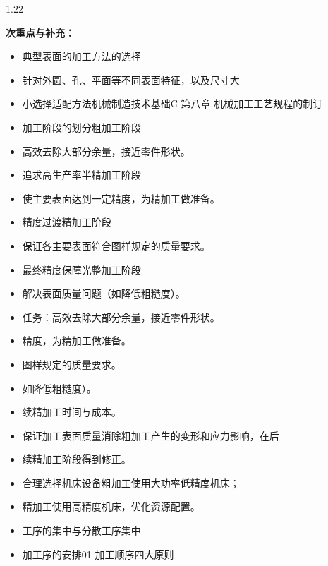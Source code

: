 \documentclass[12pt,a4paper]{article}
\begin{document}
\begin{spacing}{1.22}
\begin{tcolorbox}[colback=yellow!6,colframe=red!55!black,title=重点,left=1mm,right=1mm]
\end{tcolorbox}
\noindent\textbf{次重点与补充：}
\begin{itemize}[leftmargin=2.2em,label=--]
  \item 典型表面的加工方法的选择
  \item 针对外圆、孔、平面等不同表面特征，以及尺寸大
  \item 小选择适配方法机械制造技术基础C 第八章 机械加工工艺规程的制订
  \item 加工阶段的划分粗加工阶段
  \item 高效去除大部分余量，接近零件形状。
  \item 追求高生产率半精加工阶段
  \item 使主要表面达到一定精度，为精加工做准备。
  \item 精度过渡精加工阶段
  \item 保证各主要表面符合图样规定的质量要求。
  \item 最终精度保障光整加工阶段
  \item 解决表面质量问题（如降低粗糙度）。
  \item 任务：高效去除大部分余量，接近零件形状。
  \item 精度，为精加工做准备。
  \item 图样规定的质量要求。
  \item 如降低粗糙度）。
  \item 续精加工时间与成本。
  \item 保证加工表面质量消除粗加工产生的变形和应力影响，在后
  \item 续精加工阶段得到修正。
  \item 合理选择机床设备粗加工使用大功率低精度机床；
  \item 精加工使用高精度机床，优化资源配置。
  \item 工序的集中与分散工序集中
  \item 加工序的安排01 加工顺序四大原则
\end{itemize}


\end{spacing}
\end{document}

